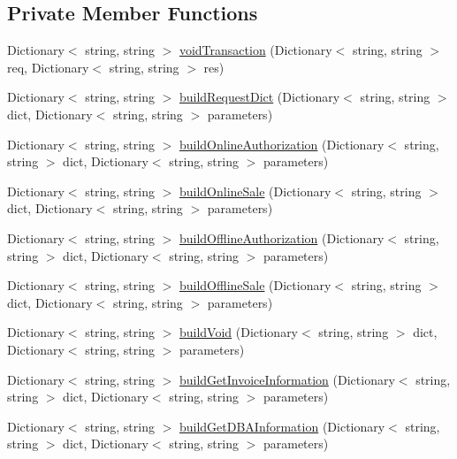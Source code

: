 \subsection*{Private Member Functions}
\begin{DoxyCompactItemize}
\item 
Dictionary$<$ string, string $>$ \mbox{\hyperlink{class_form_sim_1_1_h_t_t_p_handler_a9b0d19f62c0e810686bfafe5b7c1635e}{void\+Transaction}} (Dictionary$<$ string, string $>$ req, Dictionary$<$ string, string $>$ res)
\item 
Dictionary$<$ string, string $>$ \mbox{\hyperlink{class_form_sim_1_1_h_t_t_p_handler_a2e859f7aba91e19ddd6fe09747798624}{build\+Request\+Dict}} (Dictionary$<$ string, string $>$ dict, Dictionary$<$ string, string $>$ parameters)
\item 
Dictionary$<$ string, string $>$ \mbox{\hyperlink{class_form_sim_1_1_h_t_t_p_handler_a0f7eb27aa7bec1bc6de7c09dc38e495b}{build\+Online\+Authorization}} (Dictionary$<$ string, string $>$ dict, Dictionary$<$ string, string $>$ parameters)
\item 
Dictionary$<$ string, string $>$ \mbox{\hyperlink{class_form_sim_1_1_h_t_t_p_handler_a4cef4b23aeadba8cf19be19c648558dc}{build\+Online\+Sale}} (Dictionary$<$ string, string $>$ dict, Dictionary$<$ string, string $>$ parameters)
\item 
Dictionary$<$ string, string $>$ \mbox{\hyperlink{class_form_sim_1_1_h_t_t_p_handler_a0e74ea17a4cc7936f0fed0bc7104aea1}{build\+Offline\+Authorization}} (Dictionary$<$ string, string $>$ dict, Dictionary$<$ string, string $>$ parameters)
\item 
Dictionary$<$ string, string $>$ \mbox{\hyperlink{class_form_sim_1_1_h_t_t_p_handler_a8655b924790704629c9c746baf03b8c7}{build\+Offline\+Sale}} (Dictionary$<$ string, string $>$ dict, Dictionary$<$ string, string $>$ parameters)
\item 
Dictionary$<$ string, string $>$ \mbox{\hyperlink{class_form_sim_1_1_h_t_t_p_handler_acf01dc8988fc697ac06f4f031f045451}{build\+Void}} (Dictionary$<$ string, string $>$ dict, Dictionary$<$ string, string $>$ parameters)
\item 
Dictionary$<$ string, string $>$ \mbox{\hyperlink{class_form_sim_1_1_h_t_t_p_handler_a4722e4a151dd9ad2a90bccf55957ade2}{build\+Get\+Invoice\+Information}} (Dictionary$<$ string, string $>$ dict, Dictionary$<$ string, string $>$ parameters)
\item 
Dictionary$<$ string, string $>$ \mbox{\hyperlink{class_form_sim_1_1_h_t_t_p_handler_af1bfad7b18ee1fda69eab925aad1adc1}{build\+Get\+D\+B\+A\+Information}} (Dictionary$<$ string, string $>$ dict, Dictionary$<$ string, string $>$ parameters)

\end{DoxyCompactItemize}
